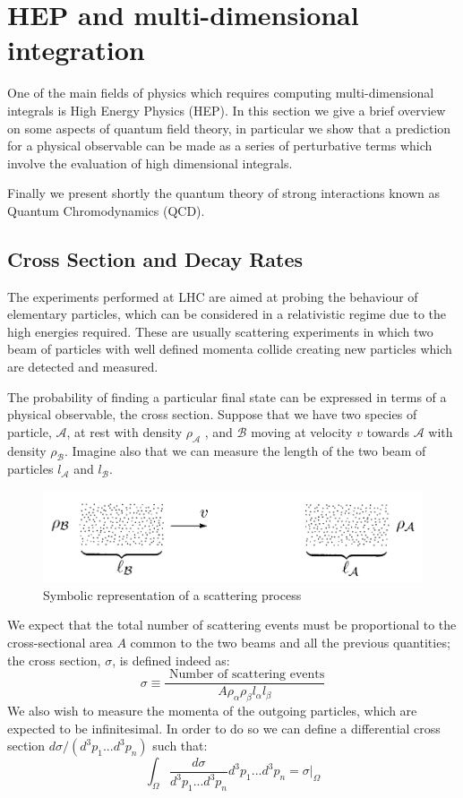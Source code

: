 \documentclass[../main/main.tex]{subfiles}
\begin{document}
\section{HEP and multi-dimensional integration}
One of the main fields of physics which requires computing multi-dimensional integrals is High Energy Physics (HEP).
In this section we give a brief overview on some aspects of quantum field theory, in particular we show that a prediction for a physical
observable can be made as a series of perturbative terms which involve the evaluation of high dimensional integrals.

Finally we present shortly the quantum theory of strong interactions known as Quantum Chromodynamics (QCD).


\subsection{Cross Section and Decay Rates}
The experiments performed at LHC are aimed at probing the behaviour of elementary particles, which can be considered in a 
relativistic regime due to the high energies required. These are usually scattering experiments in which two beam of particles with well defined momenta collide creating new particles which are detected and measured.

The probability of finding a particular final state can be expressed in terms of a physical observable, the cross section.
Suppose that we have two species of particle, $\mathcal{A}$, at rest with density $\rho_\mathcal{A}$ , and $\mathcal{B}$ moving at velocity $v$ towards $\mathcal{A}$ with density $\rho_\mathcal{B}$. Imagine also that we can measure the length of the two beam of particles $l_\mathcal{A}$ and $l_\mathcal{B}$. 

\begin{figure}[h]
	\centering
	\includegraphics[width=12cm]{../images/peskin.png}
	\caption{Symbolic representation of a scattering process}
	\label{Potential}
\end{figure}

We expect that the total number of scattering events must be proportional to the cross-sectional area $A$ common to the two beams and all the previous quantities; the cross section, $\sigma$, is defined indeed as:
\begin{equation}
	\sigma \equiv \frac{\text{ Number of scattering events}}{A \rho_\alpha \rho_\beta  l_\alpha l_\beta}
\end{equation}
We also wish to measure the momenta of the outgoing particles, which are expected to be infinitesimal. In order to do so we can define a differential cross section $ d \sigma/(d^3p_1...d^3p_n)$ such that:
\begin{equation}
	\int_\Omega \frac{ d \sigma}{d^3p_1...d^3p_n}d^3p_1...d^3p_n = \sigma|_\Omega
\end{equation}
\end{document}
